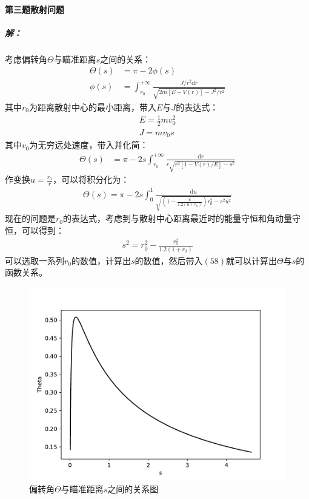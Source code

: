 \documentclass[a4paper]{ctexart}
\def\d{\mathrm{d}}
\begin{document}
    \paragraph{第三题\;\;散射问题}
    \subparagraph{解：}考虑偏转角$\Theta$与瞄准距离$s$之间的关系：
    \begin{align}
        \Theta(s) &= \pi - 2\phi(s)\\
        \phi(s) &= \int_{r_{0}}^{+\infty}\frac{J/r^{2}\d r}{\sqrt{2m[E - V(r)] - J^{2}/r^{2}}}
    \end{align}
    其中$r_{0}$为距离散射中心的最小距离，带入$E$与$J$的表达式：
    \begin{align}
        E = \frac{1}{2}mv_{0}^{2}\\
        J = mv_{0}s
    \end{align}
    其中$v_{0}$为无穷远处速度，带入并化简：
    \begin{align}
        \Theta(s) &= \pi - 2s\int_{r_{0}}^{+\infty}\frac{\d r}{r\sqrt{r^{2}[1 - V(r)/E] - s^{2}}}
    \end{align}
    作变换$u = \frac{r_{0}}{r}$，可以将积分化为：
    \begin{align}
        \Theta(s) = \pi - 2s\int_{0}^{1}\frac{\d u}{\sqrt{\left(1 - \frac{u}{1.2(u + r_{0})}\right)r_{0}^{2} - s^{2}u^{2}}}
    \end{align}
    现在的问题是$r_{0}$的表达式，考虑到与散射中心距离最近时的能量守恒和角动量守恒，可以得到：
    \begin{align}
        s^{2} = r_{0}^{2} - \frac{r_{0}^{2}}{1.2(1 + r_{0})}
    \end{align}
    可以选取一系列$r_{0}$的数值，计算出$s$的数值，然后带入$(58)$就可以计算出$\Theta$与$s$的函数关系。
    \begin{figure}[htbp]
        \centering
        \includegraphics[scale=0.70]{Theta.pdf}
        \caption{偏转角$\Theta$与瞄准距离$s$之间的关系图}
    \end{figure}
\end{document}
